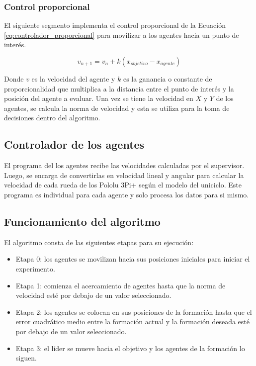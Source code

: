 \subsubsection{Control proporcional}
El siguiente segmento implementa el control proporcional de la Ecuación \ref{eq:controlador_proporcional} para movilizar a los agentes hacia un punto de interés.

\begin{equation}
	v_{n+1} = v_n + k(x_{objetivo} - x_{agente})
	\label{eq:controlador_proporcional}
\end{equation}

Donde $v$ es la velocidad del agente y $k$ es la ganancia o constante de proporcionalidad que multiplica a la distancia entre el punto de interés y la posición del agente a evaluar. Una vez se tiene la velocidad en $X$ y $Y$ de los agentes, se calcula la norma de velocidad y esta se utiliza para la toma de decisiones dentro del algoritmo.

\subsection{Controlador de los agentes}
El programa del los agentes recibe las velocidades calculadas por el supervisor. Luego, se encarga de convertirlas en velocidad lineal y angular para calcular la velocidad de cada rueda de los Pololu 3Pi+ según el modelo del uniciclo. Este programa es individual para cada agente y solo procesa los datos para si mismo.

\subsection{Funcionamiento del algoritmo}
El algoritmo consta de las siguientes etapas para su ejecución:
\begin{itemize}
	\item Etapa 0: los agentes se movilizan hacia sus posiciones iniciales para iniciar el experimento.
	\item Etapa 1: comienza el acercamiento de agentes hasta que la norma de velocidad esté por debajo de un valor seleccionado.
	\item Etapa 2: los agentes se colocan en sus posiciones de la formación hasta que el error cuadrático medio entre la formación actual y la formación deseada esté por debajo de un valor seleccionado.
	\item Etapa 3: el líder se mueve hacia el objetivo y los agentes de la formación lo siguen.
\end{itemize}


